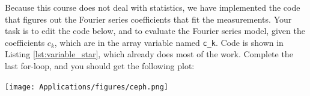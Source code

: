 Because this course does not deal with statistics, we have implemented
the code that figures out the Fourier series coefficients that fit the
measurements. Your task is to edit the code below, and to evaluate the
Fourier series model, given the coefficients $c_k$, which are in the
array variable named \verb|c_k|. Code is shown in Listing
\ref{lst:variable_star}, which already does most of the work. Complete
the last for-loop, and you should get the following plot:
\begin{center}
\texttt{[image: Applications/figures/ceph.png]}
\end{center}




